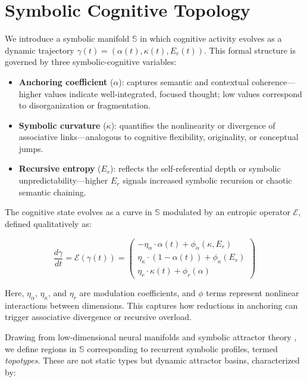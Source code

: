 \section*{Symbolic Cognitive Topology}

We introduce a symbolic manifold $\mathbb{S}$ in which cognitive activity evolves as a dynamic trajectory $\gamma(t) = (\alpha(t), \kappa(t), E_r(t))$. This formal structure is governed by three symbolic-cognitive variables:
\begin{itemize}
    \item \textbf{Anchoring coefficient} ($\alpha$): captures semantic and contextual coherence—higher values indicate well-integrated, focused thought; low values correspond to disorganization or fragmentation.
    \item \textbf{Symbolic curvature} ($\kappa$): quantifies the nonlinearity or divergence of associative links—analogous to cognitive flexibility, originality, or conceptual jumps.
    \item \textbf{Recursive entropy} ($E_r$): reflects the self-referential depth or symbolic unpredictability—higher $E_r$ signals increased symbolic recursion or chaotic semantic chaining.
\end{itemize}

The cognitive state evolves as a curve in $\mathbb{S}$ modulated by an entropic operator $\mathcal{E}$, defined qualitatively as:

\[
\frac{d\gamma}{dt} = \mathcal{E}(\gamma(t)) = 
\begin{pmatrix}
    -\eta_\alpha \cdot \alpha(t) + \phi_\alpha(\kappa,E_r) \\
    \eta_\kappa \cdot (1 - \alpha(t)) + \phi_\kappa(E_r) \\
    \eta_r \cdot \kappa(t) + \phi_r(\alpha)
\end{pmatrix}
\]

Here, $\eta_\alpha$, $\eta_\kappa$, and $\eta_r$ are modulation coefficients, and $\phi$ terms represent nonlinear interactions between dimensions. This captures how reductions in anchoring can trigger associative divergence or recursive overload.

Drawing from low-dimensional neural manifolds \cite{Langdon2023,Sizemore2019,Rouse2023} and symbolic attractor theory \cite{Helmich2021,Rolls2021}, we define regions in $\mathbb{S}$ corresponding to recurrent symbolic profiles, termed \textit{topotypes}. These are not static types but dynamic attractor basins, characterized by:

